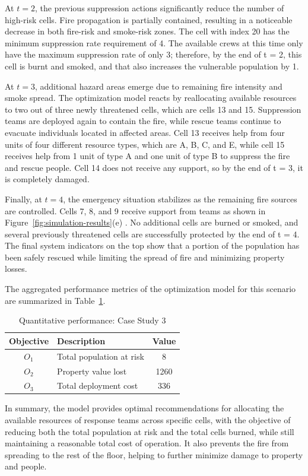 At $t = 2$, the previous suppression actions significantly reduce the number of high-risk cells. Fire propagation is partially contained, resulting in a noticeable decrease in both fire-risk and smoke-risk zones. The cell with index 20 has the minimum suppression rate requirement of 4. The available crews at this time only have the maximum suppression rate of only 3; therefore, by the end of t = 2, this cell is burnt and smoked, and that also increases the vulnerable population by 1.

At $t = 3$, additional hazard areas emerge due to remaining fire intensity and smoke spread. The optimization model reacts by reallocating available resources to two out of three newly threatened cells, which are cells 13 and 15. Suppression teams are deployed again to contain the fire, while rescue teams continue to evacuate individuals located in affected areas. Cell 13 receives help from four units of four different resource types, which are A, B, C, and E, while cell 15 receives help from 1 unit of type A and one unit of type B to suppress the fire and rescue people. Cell 14 does not receive any support, so by the end of t = 3, it is completely damaged.

Finally, at $t = 4$, the emergency situation stabilizes as the remaining fire sources are controlled. Cells 7, 8, and 9 receive support from teams as shown in Figure~\ref{fig:simulation-results}(e) . No additional cells are burned or smoked, and several previously threatened cells are successfully protected by the end of t = 4. The final system indicators on the top show that a portion of the population has been safely rescued while limiting the spread of fire and minimizing property losses.

The aggregated performance metrics of the optimization model for this scenario are summarized in Table~\ref{tab:case3_performance}.

\begin{table}[!htb]
\caption{Quantitative performance: Case Study 3}
\label{tab:case3_performance}
\centering
\begin{tabular}{|c|l|c|}
\hline
\textbf{Objective} & \textbf{Description} & \textbf{Value} \\ \hline
$O_1$ & Total population at risk & 8 \\ \hline
$O_2$ & Property value lost & 1260 \\ \hline
$O_3$ & Total deployment cost & 336 \\ \hline
\end{tabular}
\end{table}

In summary, the model provides optimal recommendations for allocating the available resources of response teams across specific cells, with the objective of reducing both the total population at risk and the total cells burned, while still maintaining a reasonable total cost of operation. It also prevents the fire from spreading to the rest of the floor, helping to further minimize damage to property and people.